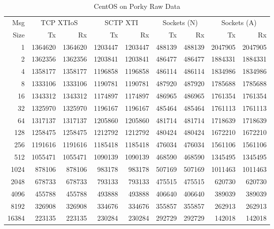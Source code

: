 \documentclass[letterpaper,final,notitlepage,twocolumn,10pt,twoside]{article}
\let\normalsize = \small
\let\small = \footnotesize
\let\footnotesize = \scriptsize
\let\scriptsize = \tiny
\begin{document}
\begin{appendix}
\begin{table}[hbp]
\footnotesize
\begin{center}
\setlength{\tabcolsep}{0.2em}
\setlength{\arraycolsep}{0.2em}
\begin{tabular}{rrrrrrrrr}\\
Msg & \multicolumn{2}{c}{TCP XTIoS} & \multicolumn{2}{c}{SCTP XTI} & \multicolumn{2}{c}{Sockets (N)} & \multicolumn{2}{c}{Sockets (A)}\\
Size & Tx & Rx & Tx & Rx & Tx & Rx & Tx & Rx\\
\hline
\hline
1 & 1364620 & 1364620 & 1203447 & 1203447 & 488139 & 488139 & 2047905 & 2047905\\
2 & 1362356 & 1362356 & 1203841 & 1203841 & 486477 & 486477 & 1884331 & 1884331\\
4 & 1358177 & 1358177 & 1196858 & 1196858 & 486114 & 486114 & 1834986 & 1834986\\
8 & 1333106 & 1333106 & 1190781 & 1190781 & 487920 & 487920 & 1785688 & 1785688\\
16 & 1343312 & 1343312 & 1174897 & 1174897 & 486965 & 486965 & 1761354 & 1761354\\
32 & 1325970 & 1325970 & 1196167 & 1196167 & 485464 & 485464 & 1761113 & 1761113\\
64 & 1317137 & 1317137 & 1205860 & 1205860 & 481714 & 481714 & 1718639 & 1718639\\
128 & 1258475 & 1258475 & 1212792 & 1212792 & 480424 & 480424 & 1672210 & 1672210\\
256 & 1191616 & 1191616 & 1185418 & 1185418 & 476034 & 476034 & 1561106 & 1561106\\
512 & 1055471 & 1055471 & 1090139 & 1090139 & 468590 & 468590 & 1345495 & 1345495\\
1024 & 878106 & 878106 & 983178 & 983178 & 507169 & 507169 & 1011463 & 1011463\\
2048 & 678733 & 678733 & 793133 & 793133 & 475515 & 475515 & 620730 & 620730\\
4096 & 455788 & 455788 & 493888 & 493888 & 406640 & 406640 & 389039 & 389039\\
8192 & 326908 & 326908 & 334676 & 334676 & 355857 & 355857 & 262913 & 262913\\
16384 & 223135 & 223135 & 230284 & 230284 & 292729 & 292729 & 142018 & 142018\\
\hline
\end{tabular}
\end{center}
\normalsize
\caption[CentOS on Porky Raw Data]{CentOS on Porky Raw Data}
\label{table:centosdata}
\end{table}


\end{appendix}
\end{document}
